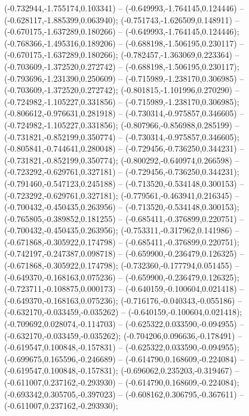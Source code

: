  (-0.732944,-1.755174,0.103341) -- (-0.649993,-1.764145,0.124446) -- (-0.628117,-1.885399,0.063940);
 (-0.751743,-1.626509,0.148911) -- (-0.670175,-1.637289,0.180266) -- (-0.649993,-1.764145,0.124446);
 (-0.768366,-1.495316,0.189206) -- (-0.688198,-1.506195,0.230117) -- (-0.670175,-1.637289,0.180266);
 (-0.782457,-1.363069,0.223364) -- (-0.703609,-1.372520,0.272742) -- (-0.688198,-1.506195,0.230117);
 (-0.793696,-1.231390,0.250609) -- (-0.715989,-1.238170,0.306985) -- (-0.703609,-1.372520,0.272742);
 (-0.801815,-1.101996,0.270290) -- (-0.724982,-1.105227,0.331856) -- (-0.715989,-1.238170,0.306985);
 (-0.806612,-0.976631,0.281918) -- (-0.730314,-0.975857,0.346605) -- (-0.724982,-1.105227,0.331856);
 (-0.807966,-0.856988,0.285199) -- (-0.731821,-0.852199,0.350774) -- (-0.730314,-0.975857,0.346605);
 (-0.805841,-0.744641,0.280048) -- (-0.729456,-0.736250,0.344231) -- (-0.731821,-0.852199,0.350774);
 (-0.800292,-0.640974,0.266598) -- (-0.723292,-0.629761,0.327181) -- (-0.729456,-0.736250,0.344231);
 (-0.791460,-0.547123,0.245188) -- (-0.713520,-0.534148,0.300153) -- (-0.723292,-0.629761,0.327181);
 (-0.779561,-0.463941,0.216345) -- (-0.700432,-0.450435,0.263956) -- (-0.713520,-0.534148,0.300153);
 (-0.765805,-0.389852,0.181255) -- (-0.685411,-0.376899,0.220751) -- (-0.700432,-0.450435,0.263956);
 (-0.753311,-0.317962,0.141986) -- (-0.671868,-0.305922,0.174798) -- (-0.685411,-0.376899,0.220751);
 (-0.742197,-0.247387,0.098718) -- (-0.659900,-0.236479,0.126325) -- (-0.671868,-0.305922,0.174798);
 (-0.732360,-0.177794,0.051455) -- (-0.649370,-0.168163,0.075236) -- (-0.659900,-0.236479,0.126325);
 (-0.723711,-0.108875,0.000173) -- (-0.640159,-0.100604,0.021418) -- (-0.649370,-0.168163,0.075236);
 (-0.716176,-0.040343,-0.055186) -- (-0.632170,-0.033459,-0.035262) -- (-0.640159,-0.100604,0.021418);
 (-0.709692,0.028074,-0.114703) -- (-0.625322,0.033590,-0.094955) -- (-0.632170,-0.033459,-0.035262);
 (-0.704206,0.096636,-0.178491) -- (-0.619547,0.100848,-0.157831) -- (-0.625322,0.033590,-0.094955);
 (-0.699675,0.165596,-0.246689) -- (-0.614790,0.168609,-0.224084) -- (-0.619547,0.100848,-0.157831);
 (-0.696062,0.235203,-0.319467) -- (-0.611007,0.237162,-0.293930) -- (-0.614790,0.168609,-0.224084);
 (-0.693342,0.305705,-0.397023) -- (-0.608162,0.306795,-0.367611) -- (-0.611007,0.237162,-0.293930);
